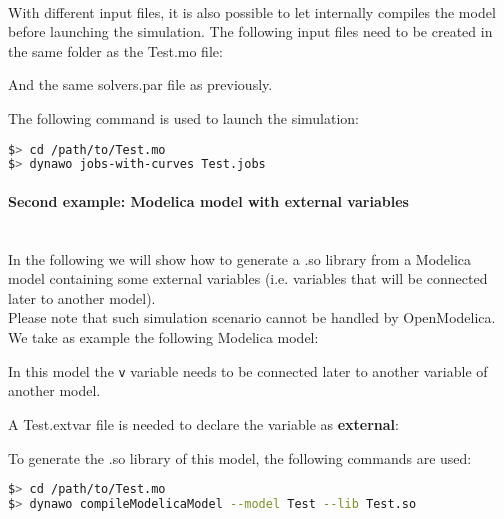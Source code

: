 \documentclass[a4paper, 12pt]{report}
\begin{document}
~~\\
With different input files, it is also possible to let \Dynawo
internally compiles the model before launching the simulation. The following input files need to be created in the same folder as the Test.mo file:




And the same solvers.par file as previously.

The following command is used to launch the simulation:
\begin{lstlisting}[language=bash,deletekeywords={jobs,help}]
$> cd /path/to/Test.mo
$> dynawo jobs-with-curves Test.jobs
\end{lstlisting}

\paragraph{Second example: Modelica model with external variables}
\label{Dynawo_Advanced_Documentation_Dynawo_executables_execDynawo_second_example}
~~\\
In the following we will show how to generate a .so library from a
Modelica model containing some external variables (i.e. variables that will be connected later to another model). \\

Please note that such simulation scenario cannot be handled by OpenModelica. \\

We take as example the following Modelica model:

In this model the \lstinline[language=Modelica]{v} variable needs to be connected later to another variable of another model.

A Test.extvar file is needed to declare the variable as \textbf{external}:



To generate the .so library of this model, the following commands are used:
\begin{lstlisting}[language=bash,deletekeywords={jobs,help}]
$> cd /path/to/Test.mo
$> dynawo compileModelicaModel --model Test --lib Test.so
\end{lstlisting}
\end{document}
